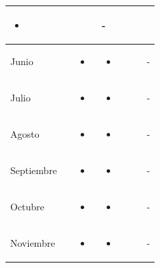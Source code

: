 \documentclass[landscape, a4paper, 10pt]{article}
\newcommand{\smallcellwidth}{0.7in}
\newcommand{\normalcellwidth}{1.2in}
\newcommand{\bigcellwidth}{2.0in}
\begin{document}
\begin{longtable}{|m{\smallcellwidth}|p{\normalcellwidth}|p{\bigcellwidth}|p{\bigcellwidth}|p{\normalcellwidth}|p{\normalcellwidth}|p{\normalcellwidth}|}
\begin{itemize}
			\item 
		\end{itemize} &
		  &
		  &
		 - \\
		\hline
		Junio &
		 &
		\begin{itemize}
			\item 
		\end{itemize} &
		\begin{itemize}
			\item 
		\end{itemize} &
		  &
		  &
		 - \\
		\hline
		Julio &
		 &
		\begin{itemize}
			\item 
		\end{itemize} &
		\begin{itemize}
			\item 
		\end{itemize} &
		  &
		  &
		 - \\
		\hline
		Agosto &
		 &
		\begin{itemize}
			\item 
		\end{itemize} &
		\begin{itemize}
			\item 
		\end{itemize} &
		  &
		  &
		 - \\
		\hline
		Septiembre &
		 &
		\begin{itemize}
			\item 
		\end{itemize} &
		\begin{itemize}
			\item 
		\end{itemize} &
		  &
		  &
		 - \\
		\hline
		Octubre &
		 &
		\begin{itemize}
			\item 
		\end{itemize} &
		\begin{itemize}
			\item 
		\end{itemize} &
		  &
		  &
		 - \\
		\hline
		Noviembre &
		 &
		\begin{itemize}
			\item 
		\end{itemize} &
		\begin{itemize}
			\item 
		\end{itemize} &
		  &
		  &
		 - \\
		\hline

	\end{longtable}
\end{document}
